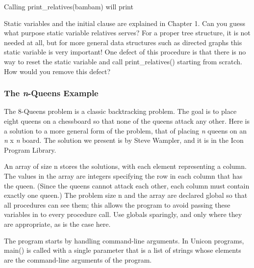 Calling print\_relatives(bambam) will print


Static variables and the \textsf{initial} clause are explained in
Chapter 1. Can you guess what purpose static variable
\textsf{relatives} serves? For a proper tree structure, it is not
needed at all, but for more general data structures such as directed
graphs this static variable is very important! One defect of this
procedure is that there is no way to reset the static variable and call
\textsf{print\_relatives()} starting from scratch. How would you remove
this defect?

\subsubsection[The n{}-Queens Example]{The \textit{n}{}-Queens Example}
The 8-Queens problem is a classic
backtracking problem. The goal is to place eight
queens on a chessboard so that none of the queens attack any other.
Here is a solution to a more general form of the problem, that of
placing \textit{n} queens on an \textit{n} \textsf{x}
\textit{n} board. The solution we present is by Steve Wampler, and it is in the Icon Program Library.

An array of size \textsf{n} stores the solutions, with each element
representing a column. The values in the array are integers specifying
the row in each column that has the queen. (Since the queens cannot
attack each other, each column must contain exactly one queen.) The
problem size \textsf{n} and the array are declared \textsf{global} so
that all procedures can see them; this allows the program to avoid
passing these variables in to every procedure call. Use globals
sparingly, and only where they are appropriate, as is the case here.


The program starts by handling command-line arguments. In Unicon
programs, \textsf{main()} is called with a single parameter that is a
list of strings whose elements are the command-line arguments of the
program.

